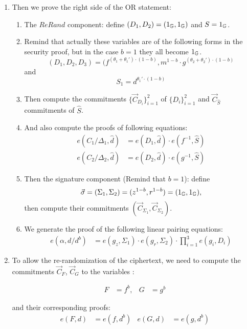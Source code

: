 \begin{description}
\begin{enumerate}
  \item Then we prove the right side of the OR statement:
    \begin{enumerate}  
    \item The $ReRand$ component: define $(D_1, D_2) = (1_{\mathbb{G}}, 1_{\mathbb{G}})$ and $S = 1_{\mathbb{G}}$.
    \item Remind that actually these variables are of the following forms in the security proof, but in the case $b=1$ they all become $1_{\mathbb{G}}$.
      $$(D_1, D_2, D_3) = (f^{(\theta_1+\theta_1')\cdot (1-b)}, m^{1-b} \cdot g^{(\theta_2+\theta_2')\cdot (1-b)}$$
      and $$S_1 = d^{\theta_1'\cdot (1-b)}$$
    \item Then compute the commitments $\{\vec{C}_{D_i}\}_{i=1}^2$ of $\{D_i\}_{i= 1}^2$ and $\vec{C}_{\hat{S}}$ commitments of $\hat{S}$.
    \item And also compute the proofs of following equations:
      \begin{align}
        e(C_1/\boxed{\Delta_1}, \hat{d}) &= e (\boxed{D_1}, \hat{d}) \cdot e(f^{-1}, \boxed{\hat{S}}) \tag{7}\\
        e(C_2/\boxed{\Delta_2}, \hat{d}) &= e (\boxed{D_2}, \hat{d}) \cdot e(g^{-1}, \boxed{\hat{S}}) \tag{8}
      \end{align}

    \item Then the signature component (Remind that $b = 1$): define
      $$\vec{\sigma}  = (\Sigma_1, \Sigma_2) = (z^{1-b}, r^{1-b}) = (1_{\mathbb{G}}, 1_{\mathbb{G}}),$$
      then compute their commitments $(\vec{C}_{\Sigma_1}, \vec{C}_{\Sigma_2})$.
    \item We generate the proof of the following linear pairing equations:
      \begin{align} 
        e(\alpha, d/\boxed{d^b}) &= e(g_z, \boxed{\Sigma_1}) \cdot e(g_r, \boxed{\Sigma_2}) \cdot \prod_{i=1}^3 e(g_i, \boxed{D_i}) \tag{9}
      \end{align}

    \end{enumerate}

  \item To allow the re-randomization of the ciphertext, we need to compute the commitments $\vec{C}_F$, $\vec{C}_G$ to the variables :

    \begin{align*}
    F &= f^b, & G&=g^b
    \end{align*}

    and their corresponding proofs:
    \begin{align}
      e(\boxed{F},d) &= e(f,\boxed{d^b}) & e(\boxed{G}, d) &= e(g, \boxed{d^b})\tag{10,11}
    \end{align}


\end{enumerate}
\end{description}
